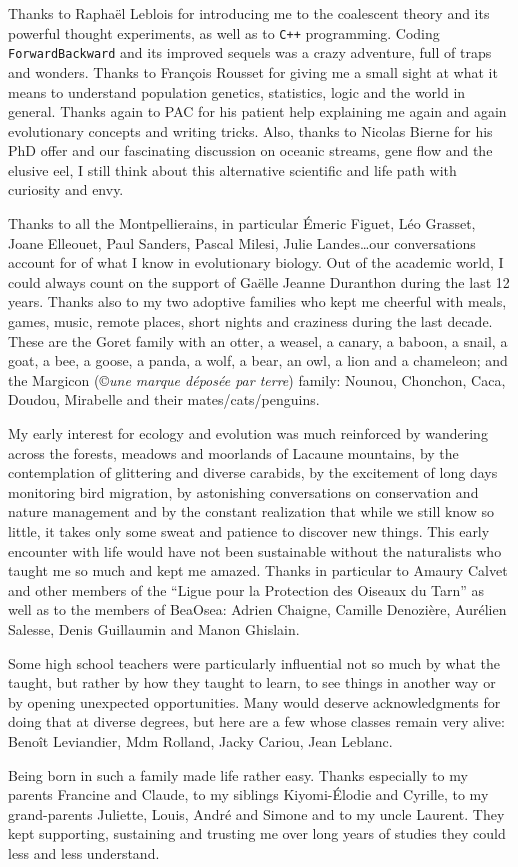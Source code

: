 Thanks to Rapha\"{e}l Leblois for introducing me to the coalescent theory and its powerful thought experiments, as well as to \texttt{C++} programming. Coding \texttt{ForwardBackward} and its improved sequels was a crazy adventure, full of traps and wonders. Thanks to Fran\c{c}ois Rousset for giving me a small sight at what it means to understand population genetics, statistics, logic and the world in general.
Thanks again to PAC for his patient help explaining me again and again evolutionary concepts and writing tricks.
Also, thanks to Nicolas Bierne for his PhD offer and our fascinating discussion on oceanic streams, gene flow and the elusive eel, I still think about this alternative scientific and life path with curiosity and envy. 

Thanks to all the Montpellierains, in particular \'{E}meric Figuet, L\'{e}o Grasset, Joane Elleouet, Paul Sanders, Pascal Milesi, Julie Landes\dots our conversations account for of what I know in evolutionary biology.
Out of the academic world, I could always count on the support of Ga\"elle Jeanne Duranthon during the last 12 years. Thanks also to my two adoptive families who kept me cheerful with meals, games, music, remote places, short nights and craziness during the last decade. These are the Goret family with an otter, a weasel, a canary, a baboon, a snail, a goat, a bee, a goose, a panda, a wolf, a bear, an owl, a lion and a chameleon; and the Margicon (\copyright \textit{une marque d\'{e}pos\'{e}e par terre}) family: Nounou, Chonchon, Caca, Doudou, Mirabelle and their mates/cats/penguins.

My early interest for ecology and evolution was much reinforced by wandering across the forests, meadows and moorlands of Lacaune mountains, by the contemplation of glittering and diverse carabids, by the excitement of long days monitoring bird migration, by astonishing conversations on conservation and nature management and by the constant realization that while we still know so little, it takes only some sweat and patience to discover new things.
This early encounter with life would have not been sustainable without the naturalists who taught me so much and kept me amazed. Thanks in particular to Amaury Calvet and other members of the ``Ligue pour la Protection des Oiseaux du Tarn'' as well as to the members of BeaOsea: Adrien Chaigne, Camille Denozière, Aur\'{e}lien Salesse, Denis Guillaumin and Manon Ghislain.

Some high school teachers were particularly influential not so much by what the taught, but rather by how they taught to learn, to see things in another way or by opening unexpected opportunities. Many would deserve acknowledgments for doing that at diverse degrees, but here are a few whose classes remain very alive: Beno\^{i}t Leviandier, Mdm Rolland, Jacky Cariou, Jean Leblanc.

Being born in such a family made life rather easy. Thanks especially to my parents Francine and Claude, to my siblings Kiyomi-\'{E}lodie and Cyrille, to my grand-parents Juliette, Louis, Andr\'{e} and Simone and to my uncle Laurent. They kept supporting, sustaining and trusting me over long years of studies they could less and less understand.